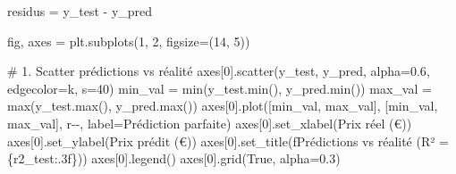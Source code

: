 \documentclass[
  french,
  11pt,
  a4paper,
]{scrbook}
\newenvironment{Shaded}{}{}
\newcommand{\BuiltInTok}[1]{\textcolor[rgb]{0.84,0.23,0.29}{#1}}
\newcommand{\CommentTok}[1]{\textcolor[rgb]{0.42,0.45,0.49}{#1}}
\newcommand{\DecValTok}[1]{\textcolor[rgb]{0.00,0.36,0.77}{#1}}
\newcommand{\FloatTok}[1]{\textcolor[rgb]{0.00,0.36,0.77}{#1}}
\newcommand{\NormalTok}[1]{\textcolor[rgb]{0.14,0.16,0.18}{#1}}
\newcommand{\OperatorTok}[1]{\textcolor[rgb]{0.14,0.16,0.18}{#1}}
\newcommand{\SpecialCharTok}[1]{\textcolor[rgb]{0.00,0.36,0.77}{#1}}
\newcommand{\SpecialStringTok}[1]{\textcolor[rgb]{0.01,0.18,0.38}{#1}}
\newcommand{\StringTok}[1]{\textcolor[rgb]{0.01,0.18,0.38}{#1}}
\newcommand{\VariableTok}[1]{\textcolor[rgb]{0.89,0.38,0.04}{#1}}
\begin{document}
\begin{tcolorbox}[enhanced jigsaw, arc=.35mm, bottomrule=.15mm, bottomtitle=1mm, breakable, colback=white, colbacktitle=quarto-callout-tip-color!10!white, colframe=quarto-callout-tip-color-frame, coltitle=black, left=2mm, leftrule=.75mm, opacityback=0, opacitybacktitle=0.6, rightrule=.15mm, title=\textcolor{quarto-callout-tip-color}{\faLightbulb}\hspace{0.5em}{✅ Corrigé Étape 5.4}, titlerule=0mm, toprule=.15mm, toptitle=1mm]

\begin{Shaded}
\begin{Highlighting}[]
\NormalTok{residus }\OperatorTok{=}\NormalTok{ y\_test }\OperatorTok{{-}}\NormalTok{ y\_pred}

\NormalTok{fig, axes }\OperatorTok{=}\NormalTok{ plt.subplots(}\DecValTok{1}\NormalTok{, }\DecValTok{2}\NormalTok{, figsize}\OperatorTok{=}\NormalTok{(}\DecValTok{14}\NormalTok{, }\DecValTok{5}\NormalTok{))}

\CommentTok{\# 1. Scatter prédictions vs réalité}
\NormalTok{axes[}\DecValTok{0}\NormalTok{].scatter(y\_test, y\_pred, alpha}\OperatorTok{=}\FloatTok{0.6}\NormalTok{, edgecolor}\OperatorTok{=}\StringTok{\textquotesingle{}k\textquotesingle{}}\NormalTok{, s}\OperatorTok{=}\DecValTok{40}\NormalTok{)}
\NormalTok{min\_val }\OperatorTok{=} \BuiltInTok{min}\NormalTok{(y\_test.}\BuiltInTok{min}\NormalTok{(), y\_pred.}\BuiltInTok{min}\NormalTok{())}
\NormalTok{max\_val }\OperatorTok{=} \BuiltInTok{max}\NormalTok{(y\_test.}\BuiltInTok{max}\NormalTok{(), y\_pred.}\BuiltInTok{max}\NormalTok{())}
\NormalTok{axes[}\DecValTok{0}\NormalTok{].plot([min\_val, max\_val], [min\_val, max\_val], }\StringTok{\textquotesingle{}r{-}{-}\textquotesingle{}}\NormalTok{, label}\OperatorTok{=}\StringTok{\textquotesingle{}Prédiction parfaite\textquotesingle{}}\NormalTok{)}
\NormalTok{axes[}\DecValTok{0}\NormalTok{].set\_xlabel(}\StringTok{\textquotesingle{}Prix réel (€)\textquotesingle{}}\NormalTok{)}
\NormalTok{axes[}\DecValTok{0}\NormalTok{].set\_ylabel(}\StringTok{\textquotesingle{}Prix prédit (€)\textquotesingle{}}\NormalTok{)}
\NormalTok{axes[}\DecValTok{0}\NormalTok{].set\_title(}\SpecialStringTok{f\textquotesingle{}Prédictions vs réalité (R² = }\SpecialCharTok{\{}\NormalTok{r2\_test}\SpecialCharTok{:.3f\}}\SpecialStringTok{)\textquotesingle{}}\NormalTok{)}
\NormalTok{axes[}\DecValTok{0}\NormalTok{].legend()}
\NormalTok{axes[}\DecValTok{0}\NormalTok{].grid(}\VariableTok{True}\NormalTok{, alpha}\OperatorTok{=}\FloatTok{0.3}\NormalTok{)}


\end{Highlighting}
\end{Shaded}
\end{tcolorbox}
\end{document}
